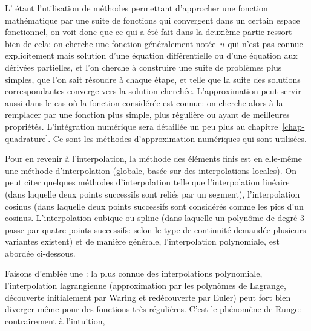 L' étant l'utilisation de méthodes permettant d'approcher une fonction mathématique par une suite de fonctions qui convergent dans un certain espace fonctionnel, on voit donc que ce qui a été fait dans la deuxième partie ressort bien de cela: on cherche une fonction généralement notée~$u$ qui n'est pas connue explicitement mais solution d'une équation différentielle ou d'une équation aux dérivées partielles, et l'on cherche à construire une suite de problèmes plus simples, que l'on sait résoudre à chaque étape, et telle que la suite des solutions correspondantes converge vers la solution cherchée. L'approximation peut servir aussi dans le cas où la fonction considérée est connue: on cherche alors à la remplacer par une fonction plus simple, plus régulière ou ayant de meilleures propriétés. L'intégration numérique sera détaillée un peu plus au chapitre~\ref{chap-quadrature}. Ce sont les méthodes d'approximation numériques qui sont utilisées. 

Pour en revenir à l'interpolation, la méthode des éléments finis est en elle-même une méthode d'interpolation (globale, basée sur des interpolations locales). On peut citer quelques méthodes d'interpolation telle que l'interpolation linéaire (dans laquelle deux points successifs sont reliés par un segment), l'interpolation cosinus (dans laquelle deux points successifs sont considérés comme les pics d'un cosinus. L'interpolation cubique ou spline (dans laquelle un polynôme de degré 3 passe par quatre points successifs: selon le type de continuité demandée plusieurs variantes existent) et de manière générale, l'interpolation polynomiale, est abordée ci-dessous. 

Faisons d'emblée une : la plus connue des interpolations polynomiale, l'interpolation lagrangienne (approximation par les polynômes de Lagrange, découverte initialement par Waring et redécouverte par Euler) peut fort bien diverger même pour des fonctions très régulières. C'est le phénomène de Runge: contrairement à l'intuition, 

